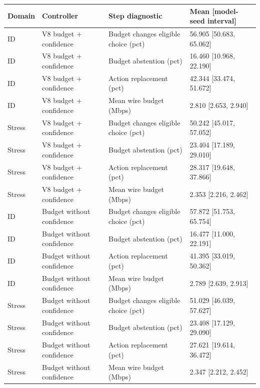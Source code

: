 \begin{tabular}{llll}
\toprule
Domain & Controller & Step diagnostic & Mean [model-seed interval] \\
\midrule
ID & V8 budget + confidence & Budget changes eligible choice (pct) & 56.905 [50.683, 65.062] \\
ID & V8 budget + confidence & Budget abstention (pct) & 16.460 [10.968, 22.190] \\
ID & V8 budget + confidence & Action replacement (pct) & 42.344 [33.474, 51.672] \\
ID & V8 budget + confidence & Mean wire budget (Mbps) & 2.810 [2.653, 2.940] \\
Stress & V8 budget + confidence & Budget changes eligible choice (pct) & 50.242 [45.017, 57.052] \\
Stress & V8 budget + confidence & Budget abstention (pct) & 23.404 [17.189, 29.010] \\
Stress & V8 budget + confidence & Action replacement (pct) & 28.317 [19.648, 37.866] \\
Stress & V8 budget + confidence & Mean wire budget (Mbps) & 2.353 [2.216, 2.462] \\
ID & Budget without confidence & Budget changes eligible choice (pct) & 57.872 [51.753, 65.754] \\
ID & Budget without confidence & Budget abstention (pct) & 16.477 [11.000, 22.191] \\
ID & Budget without confidence & Action replacement (pct) & 41.395 [33.019, 50.362] \\
ID & Budget without confidence & Mean wire budget (Mbps) & 2.789 [2.639, 2.913] \\
Stress & Budget without confidence & Budget changes eligible choice (pct) & 51.029 [46.039, 57.627] \\
Stress & Budget without confidence & Budget abstention (pct) & 23.408 [17.129, 29.090] \\
Stress & Budget without confidence & Action replacement (pct) & 27.621 [19.614, 36.472] \\
Stress & Budget without confidence & Mean wire budget (Mbps) & 2.347 [2.212, 2.452] \\
\bottomrule
\end{tabular}
